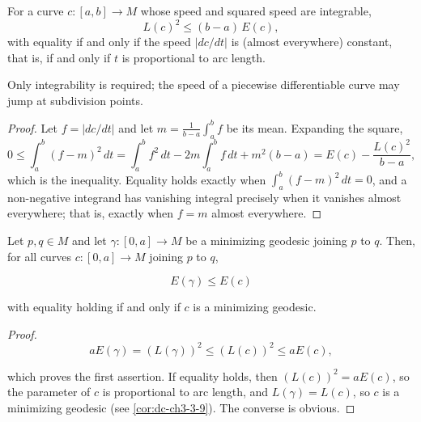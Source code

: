 \begin{lemma}
  \label{lem:dc-ch9-2-2-schwarz}
  \leanok
  For a curve $c:[a,b]\to M$ whose speed and squared speed are integrable,
  $$
  L(c)^2\le (b-a)\,E(c),
  $$
  with equality if and only if the speed $|dc/dt|$ is (almost everywhere) constant, that
  is, if and only if $t$ is proportional to arc length.

  Only integrability is required; the speed of a piecewise differentiable curve
  may jump at subdivision points.
\end{lemma}
\begin{proof}
  \leanok
  \sketch
  Let $f=|dc/dt|$ and let $m=\frac{1}{b-a}\int_a^b f$ be its mean. Expanding the square,
  $$
  0\le\int_a^b (f-m)^2\,dt=\int_a^b f^2\,dt-2m\int_a^b f\,dt+m^2(b-a)=E(c)-\frac{L(c)^2}{b-a},
  $$
  which is the inequality. Equality holds exactly when $\int_a^b(f-m)^2\,dt=0$, and a
  non-negative integrand has vanishing integral precisely when it vanishes almost
  everywhere; that is, exactly when $f=m$ almost everywhere.
\end{proof}
\begin{lemma}
  \label{lem:dc-ch9-2-3}
  Let $p,q\in M$ and let $\gamma:[0,a]\to M$ be a minimizing geodesic joining $p$ to
  $q$. Then, for all curves $c:[0,a]\to M$ joining $p$ to $q$,

  $$
  E(\gamma)\le E(c)
  $$

  with equality holding if and only if $c$ is a minimizing geodesic.
\end{lemma}
\begin{proof}
  \sketch
  $$
  aE(\gamma)=(L(\gamma))^2\le(L(c))^2\le aE(c),
  $$

  which proves the first assertion. If equality holds, then $(L(c))^2=aE(c)$, so the
  parameter of $c$ is proportional to arc length, and $L(\gamma)=L(c)$, so $c$ is a
  minimizing geodesic (see \cref{cor:dc-ch3-3-9}). The converse is obvious.

\end{proof}
